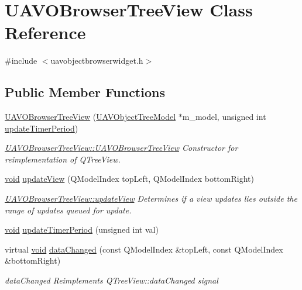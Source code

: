 \hypertarget{class_u_a_v_o_browser_tree_view}{\section{\-U\-A\-V\-O\-Browser\-Tree\-View \-Class \-Reference}
\label{class_u_a_v_o_browser_tree_view}
}


{\ttfamily \#include $<$uavobjectbrowserwidget.\-h$>$}

\subsection*{\-Public \-Member \-Functions}
\begin{DoxyCompactItemize}
\item 
\hyperlink{group___u_a_v_object_browser_plugin_gac8e16cfc29870fb1f96574c5e0a99f13}{\-U\-A\-V\-O\-Browser\-Tree\-View} (\hyperlink{class_u_a_v_object_tree_model}{\-U\-A\-V\-Object\-Tree\-Model} $\ast$m\-\_\-model, unsigned int \hyperlink{group___u_a_v_object_browser_plugin_ga9a903a75f0eb4f7b88c87dc948d8f63a}{update\-Timer\-Period})
\begin{DoxyCompactList}\small\item\em \hyperlink{group___u_a_v_object_browser_plugin_gac8e16cfc29870fb1f96574c5e0a99f13}{\-U\-A\-V\-O\-Browser\-Tree\-View\-::\-U\-A\-V\-O\-Browser\-Tree\-View} \-Constructor for reimplementation of \-Q\-Tree\-View. \end{DoxyCompactList}\item 
\hyperlink{group___u_a_v_objects_plugin_ga444cf2ff3f0ecbe028adce838d373f5c}{void} \hyperlink{group___u_a_v_object_browser_plugin_ga39a127a4af34e1ea92aca8448ee5e92f}{update\-View} (\-Q\-Model\-Index top\-Left, \-Q\-Model\-Index bottom\-Right)
\begin{DoxyCompactList}\small\item\em \hyperlink{group___u_a_v_object_browser_plugin_ga39a127a4af34e1ea92aca8448ee5e92f}{\-U\-A\-V\-O\-Browser\-Tree\-View\-::update\-View} \-Determines if a view updates lies outside the range of updates queued for update. \end{DoxyCompactList}\item 
\hyperlink{group___u_a_v_objects_plugin_ga444cf2ff3f0ecbe028adce838d373f5c}{void} \hyperlink{group___u_a_v_object_browser_plugin_ga9a903a75f0eb4f7b88c87dc948d8f63a}{update\-Timer\-Period} (unsigned int val)
\item 
virtual \hyperlink{group___u_a_v_objects_plugin_ga444cf2ff3f0ecbe028adce838d373f5c}{void} \hyperlink{group___u_a_v_object_browser_plugin_ga854dce00ee3378eb2fc1414eaaaf2a00}{data\-Changed} (const \-Q\-Model\-Index \&top\-Left, const \-Q\-Model\-Index \&bottom\-Right)
\begin{DoxyCompactList}\small\item\em data\-Changed \-Reimplements \-Q\-Tree\-View\-::data\-Changed signal \end{DoxyCompactList}\end{DoxyCompactItemize}


